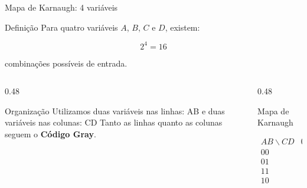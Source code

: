 \begin{frame}{Mapa de Karnaugh: 4 variáveis}
    \small

    \begin{block}{Definição}
        Para quatro variáveis $A$, $B$, $C$ e $D$, existem:

        \[
            2^4 = 16
        \]

        combinações possíveis de entrada.
    \end{block}

    \begin{columns}[T]

        \begin{column}{0.48\textwidth}
            \begin{block}{Organização}
                Utilizamos duas variáveis nas linhas: AB
                e duas variáveis nas colunas: CD
                Tanto as linhas quanto as colunas seguem
                o \textbf{Código Gray}.
            \end{block}
        \end{column}

        \begin{column}{0.48\textwidth}
            \begin{block}{Mapa de Karnaugh}

                \[
                \begin{array}{c|cccc}
                    AB\backslash CD & 00 & 01 & 11 & 10 \\ \hline
                    00 & & & & \\
                    01 & & & & \\
                    11 & & & & \\
                    10 & & & &
                \end{array}
                \]

            \end{block}
        \end{column}

    \end{columns}

\end{frame}